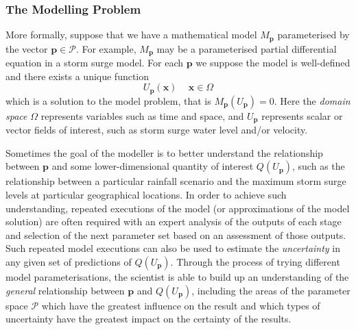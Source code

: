 \subsubsection*{The Modelling Problem}

More formally, suppose that we have a mathematical model
$M_{\mathbf{p}}$ parameterised by the vector
$\mathbf{p}\in\mathcal{P}$. For example, $M_{\mathbf{p}}$ may be a
parameterised partial differential equation %
in a storm surge model. For each $\mathbf{p}$ we suppose the model is
well-defined and there exists a unique function
\begin{equation}
  \label{eq:1}
  U_{\mathbf{p}}(\mathbf{x})\, \quad \mathbf{x}\in\Omega
\end{equation}
which is a solution to the model problem, that is $M_{\mathbf{p}}(U_{\mathbf{p}})=0$.
Here the \emph{domain space} $\Omega$ represents variables such as 
time and space, 
and $U_{\mathbf{p}}$ represents scalar or vector fields of interest, 
such as storm surge water level and/or velocity.    

Sometimes the goal of the modeller is to better understand the
relationship between $\mathbf{p}$ and some lower-dimensional quantity
of interest $Q(U_{\mathbf{p}})$, such as the relationship between a
particular rainfall scenario and the maximum storm surge levels at
particular geographical locations. In order to achieve such
understanding, repeated executions of the model (or approximations of the model solution) are often required
with an expert analysis of the outputs of each stage and selection of
the next parameter set based on an assessment of those outputs. Such
repeated model executions can also be used to estimate the
\emph{uncertainty} in any given set of predictions of
$Q(U_{\mathbf{p}})$. Through the process of trying different model
parameterisations, the scientist is able to build up an understanding
of the \emph{general} relationship between $\mathbf{p}$ and
$Q(U_{\mathbf{p}})$, including the areas of the parameter space
$\mathcal{P}$ which have the greatest influence on the result and
which types of uncertainty have the greatest impact on the certainty
of the results.

